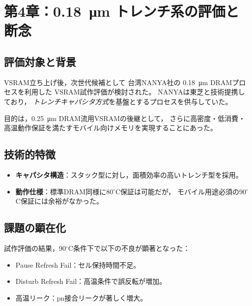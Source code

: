 \documentclass[conference]{IEEEtran}
\let\meter\metre
\begin{document}
\section{第4章：\texorpdfstring{\SI{0.18}{\micro\meter}}{0.18μm} トレンチ系の評価と断念}

\subsection{評価対象と背景}
VSRAM立ち上げ後，次世代候補として
台湾NANYA社の \SI{0.18}{\micro\meter} DRAMプロセスを利用した
VSRAM試作評価が検討された。
NANYAは東芝と技術提携しており，
\emph{トレンチキャパシタ方式}を基盤とするプロセスを供与していた。

目的は，\SI{0.25}{\micro\meter} DRAM流用VSRAMの後継として，
さらに高密度・低消費・高温動作保証を満たすモバイル向けメモリを実現することにあった。

\subsection{技術的特徴}
\begin{itemize}
  \item \textbf{キャパシタ構造}：スタック型に対し，面積効率の高いトレンチ型を採用。
  \item \textbf{動作仕様}：標準DRAM同様に80$^\circ$C保証は可能だが，
        モバイル用途必須の90$^\circ$C保証には余裕がなかった。
\end{itemize}

\subsection{課題の顕在化}
試作評価の結果，90$^\circ$C条件下で以下の不良が顕著となった：
\begin{itemize}
  \item Pause Refresh Fail：セル保持時間不足。
  \item Disturb Refresh Fail：高温条件で誤反転が増加。
  \item 高温リーク：pn接合リークが著しく増大。
\end{itemize}
\end{document}
